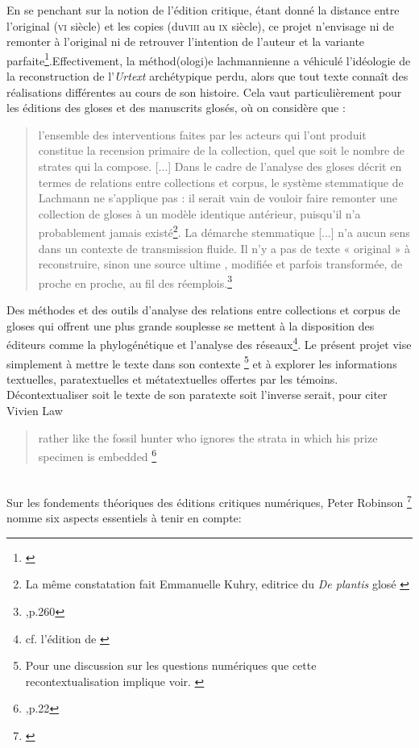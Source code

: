 \documentclass[a4paper, twoside, 12pt]{book}
\begin{document}
En se penchant sur la notion de l'édition critique, étant donné la distance entre l’original (\textsc{vi}\ieme{} siècle) et les copies (du\textsc{viii}\ieme{} au \textsc{ix}\ieme{} siècle), ce projet n’envisage ni de remonter à l’original ni de retrouver l’intention de l’auteur et la variante parfaite\footnote{\cite{cerquiglini1990eloge}}.Effectivement, la méthod(ologi)e lachmannienne a véhiculé l’idéologie de la reconstruction de l’\textit{Urtext} archétypique perdu, alors que tout texte connaît des réalisations différentes au cours de son histoire. Cela vaut particulièrement pour les éditions des gloses et des manuscrits glosés, où on considère  que : \blockquote{l’ensemble des interventions faites par les acteurs qui l’ont produit constitue la recension primaire de la collection, quel que soit le nombre de strates qui la compose. [...] Dans le cadre de l’analyse des gloses décrit en termes de relations entre collections et corpus, le système stemmatique de Lachmann ne s’applique pas : il serait vain de vouloir faire remonter une collection de gloses à un modèle identique antérieur, puisqu’il n’a probablement jamais existé\footnote{ La même constatation fait Emmanuelle Kuhry, editrice du \textit{De plantis} glosé \cite{kuhry2020medieval}}. La démarche stemmatique [...] n'a aucun sens dans un contexte de transmission fluide. Il n’y a pas de texte « original » à reconstruire, sinon une source \og{} ultime \fg{}, modifiée et parfois transformée, de proche en proche, au fil des réemplois.\footnote{\cite{cinato2015priscien},p.260}}. Des méthodes et des outils d'analyse des relations entre collections et corpus de gloses qui offrent une plus grande souplesse se mettent à la disposition des éditeurs comme la phylogénétique et l'analyse des réseaux\footnote{cf. l'édition de \cite{steinova2021glosses}}. Le présent projet vise  simplement à mettre le texte dans son contexte \footnote{Pour une discussion sur les questions numériques que cette recontextualisation implique voir. \cite{pierazzo2011putting}} et à explorer les informations textuelles, paratextuelles et métatextuelles offertes par les témoins. Décontextualiser soit le texte de son paratexte soit l'inverse serait, pour citer Vivien Law \blockquote{rather like the fossil hunter who ignores the strata in which his prize specimen is embedded \footnote{\cite{law1997grammar},p.22}}.\\

Sur les fondements théoriques des éditions critiques numériques, Peter Robinson \footnote{\cite{robinson2001critical}} nomme six aspects essentiels à tenir en compte:
\end{document}

